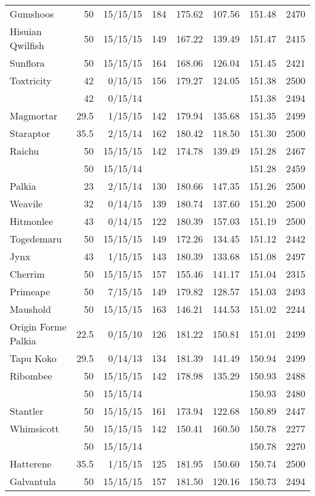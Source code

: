 \begin{longtable}{lrrrrrrr}
Gumshoos & 50 & 15/15/15 & 184 & 175.62 & 107.56 & 151.48 & 2470\\
Hisuian Qwilfish & 50 & 15/15/15 & 149 & 167.22 & 139.49 & 151.47 & 2415\\
Sunflora & 50 & 15/15/15 & 164 & 168.06 & 126.04 & 151.45 & 2421\\
Toxtricity & 42 & 0/15/15 & 156 & 179.27 & 124.05 & 151.38 & 2500\\
 & 42 & 0/15/14 & & & & 151.38 & 2494\\
Magmortar & 29.5 & 1/15/15 & 142 & 179.94 & 135.68 & 151.35 & 2499\\
Staraptor & 35.5 & 2/15/14 & 162 & 180.42 & 118.50 & 151.30 & 2500\\
Raichu & 50 & 15/15/15 & 142 & 174.78 & 139.49 & 151.28 & 2467\\
 & 50 & 15/15/14 & & & & 151.28 & 2459\\
Palkia & 23 & 2/15/14 & 130 & 180.66 & 147.35 & 151.26 & 2500\\
Weavile & 32 & 0/14/15 & 139 & 180.74 & 137.60 & 151.20 & 2500\\
Hitmonlee & 43 & 0/14/15 & 122 & 180.39 & 157.03 & 151.19 & 2500\\
Togedemaru & 50 & 15/15/15 & 149 & 172.26 & 134.45 & 151.12 & 2442\\
Jynx & 43 & 1/15/15 & 143 & 180.39 & 133.68 & 151.08 & 2497\\
Cherrim & 50 & 15/15/15 & 157 & 155.46 & 141.17 & 151.04 & 2315\\
Primeape & 50 & 7/15/15 & 149 & 179.82 & 128.57 & 151.03 & 2493\\
Maushold & 50 & 15/15/15 & 163 & 146.21 & 144.53 & 151.02 & 2244\\
Origin Forme Palkia & 22.5 & 0/15/10 & 126 & 181.22 & 150.81 & 151.01 & 2499\\
Tapu Koko & 29.5 & 0/14/13 & 134 & 181.39 & 141.49 & 150.94 & 2499\\
Ribombee & 50 & 15/15/15 & 142 & 178.98 & 135.29 & 150.93 & 2488\\
 & 50 & 15/15/14 & & & & 150.93 & 2480\\
Stantler & 50 & 15/15/15 & 161 & 173.94 & 122.68 & 150.89 & 2447\\
Whimsicott & 50 & 15/15/15 & 142 & 150.41 & 160.50 & 150.78 & 2277\\
 & 50 & 15/15/14 & & & & 150.78 & 2270\\
Hatterene & 35.5 & 1/15/15 & 125 & 181.95 & 150.60 & 150.74 & 2500\\
Galvantula & 50 & 15/15/15 & 157 & 181.50 & 120.16 & 150.73 & 2494\\

\end{longtable}
